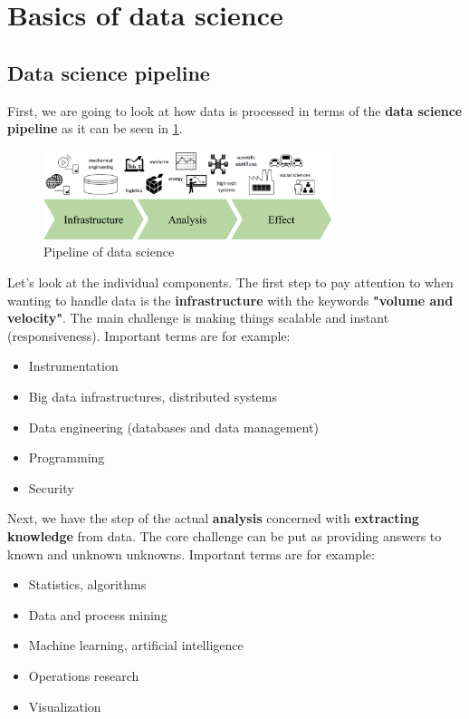 \section{Basics of data science}
\setcounter{figure}{0}

\subsection{Data science pipeline}
First, we are going to look at how data is processed in terms of the \textbf{data science pipeline} as it can be seen in \ref{fig:1_pipeline}. 

\begin{figure}[H]
  \centering
  \includegraphics[width=0.75\textwidth]{assets/basics/pipeline.png}
  \caption{Pipeline of data science}
  \label{fig:1_pipeline}
\end{figure}

Let's look at the individual components. The first step to pay attention to when wanting to handle data is the \textbf{infrastructure} with the keywords \textbf{"volume and velocity"}. The main challenge is making things scalable and instant (responsiveness). Important terms are for example:
\begin{itemize}
  \item Instrumentation
  \item Big data infrastructures, distributed systems
  \item Data engineering (databases and data management)
  \item Programming
  \item Security
\end{itemize}

Next, we have the step of the actual \textbf{analysis} concerned with \textbf{extracting knowledge} from data. The core challenge can be put as providing answers to known and unknown unknowns. Important terms are for example:
\begin{itemize}
  \item Statistics, algorithms
  \item Data and process mining
  \item Machine learning, artificial intelligence
  \item Operations research
  \item Visualization
\end{itemize}

